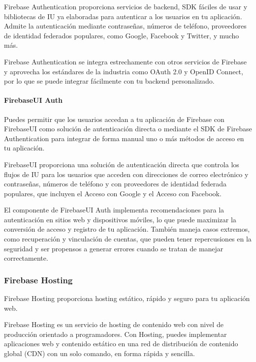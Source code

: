 Firebase Authentication proporciona servicios de backend, SDK fáciles de usar y
bibliotecas de IU ya elaboradas para autenticar a los usuarios en tu aplicación.
Admite la autenticación mediante contraseñas, números de teléfono, proveedores
de identidad federados populares, como Google, Facebook y Twitter, y mucho más.

Firebase Authentication se integra estrechamente con otros servicios de Firebase
y aprovecha los estándares de la industria como OAuth 2.0 y OpenID Connect, por
lo que se puede integrar fácilmente con tu backend personalizado.


\paragraph{FirebaseUI Auth}
\label{\detokenize{chapter_one/firebase:firebaseui-auth}}
Puedes permitir que los usuarios accedan a tu aplicación de Firebase con FirebaseUI
como solución de autenticación directa o mediante el SDK de Firebase
Authentication para integrar de forma manual uno o más métodos de acceso en tu
aplicación.

FirebaseUI proporciona una solución de autenticación directa que controla los
flujos de IU para los usuarios que acceden con direcciones de correo electrónico
y contraseñas, números de teléfono y con proveedores de identidad federada
populares, que incluyen el Acceso con Google y el Acceso con Facebook.

El componente de FirebaseUI Auth implementa recomendaciones para la autenticación
en sitios web y dispositivos móviles, lo que puede maximizar la conversión de
acceso y registro de tu aplicación. También maneja casos extremos, como recuperación
y vinculación de cuentas, que pueden tener repercusiones en la seguridad y ser
propensos a generar errores cuando se tratan de manejar correctamente.



\subsubsection{Firebase Hosting}
\label{\detokenize{chapter_one/firebase:firebase-hosting}}
Firebase Hosting proporciona hosting estático, rápido y seguro para tu aplicación web.

Firebase Hosting es un servicio de hosting de contenido web con nivel de
producción orientado a programadores. Con Hosting, puedes implementar aplicaciones web
y contenido estático en una red de distribución de contenido global (CDN) con
un solo comando, en forma rápida y sencilla.

